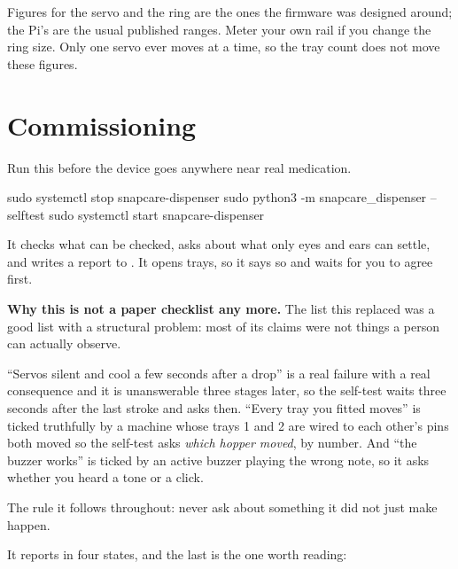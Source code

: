\documentclass[11pt,a4paper]{article}
\begin{document}
\noindent Figures for the servo and the ring are the ones the firmware was
designed around; the Pi's are the usual published ranges. Meter your own rail if
you change the ring size. Only one servo ever moves at a time, so the tray
count does not move these figures.

\clearpage

\section{Commissioning}

Run this before the device goes anywhere near real medication.

\begin{shell}
sudo systemctl stop snapcare-dispenser
sudo python3 -m snapcare_dispenser --selftest
sudo systemctl start snapcare-dispenser
\end{shell}

\noindent It checks what can be checked, asks about what only eyes and ears can
settle, and writes a report to . It
opens trays, so it says so and waits for you to agree first.

\vspace{2mm}
\begin{notebox}
\textbf{\sffamily Why this is not a paper checklist any more.} The list this
replaced was a good list with a structural problem: most of its claims were not
things a person can actually observe.

\vspace{1ex}
``Servos silent and cool a few seconds after a drop'' is a real failure with a
real consequence and it is unanswerable three stages later, so the self-test
waits three seconds after the last stroke and asks then. ``Every tray you fitted
moves'' is ticked truthfully by a machine whose trays 1 and 2 are wired to each
other's pins \textemdash{} both moved \textemdash{} so the self-test asks
\emph{which hopper moved}, by number. And ``the buzzer works'' is ticked by an
active buzzer playing the wrong note, so it asks whether you heard a tone or a
click.

\vspace{1ex}
The rule it follows throughout: never ask about something it did not just make
happen.
\end{notebox}

\vspace{2mm}
\noindent It reports in four states, and the last is the one worth reading:
\end{document}
